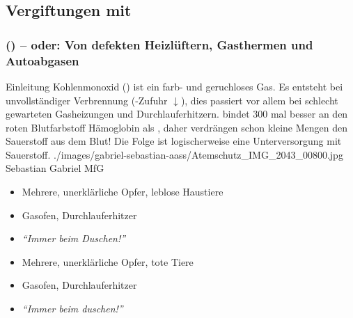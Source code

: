 \subsection{Vergiftungen mit }

\Text
{{\TxBeschreibung}}%
{%

}%



\subsubsection{ 
(\texorpdfstring{}{CO}) -- oder: Von defekten
Heizlüftern, Gasthermen und Autoabgasen}


\TextSlideTeaser
{Einleitung}%
{%
Kohlenmonoxid () ist ein farb- und geruchloses Gas.
Es entsteht bei unvollständiger Verbrennung (-Zufuhr
${\downarrow}$), dies passiert vor allem bei schlecht
gewarteten Gasheizungen und Durchlauferhitzern. 
bindet 300 mal besser an den roten Blutfarbstoff Hämoglobin
als , daher verdrängen schon kleine Mengen den
Sauerstoff aus dem Blut! Die Folge ist logischerweise eine
Unterversorgung mit Sauerstoff.}%
{}%
{./images/gabriel-sebastian-aass/Atemschutz_IMG_2043_00800.jpg}%
{}%
{}%
{Sebastian Gabriel}%
{MfG}%


{
\begin{itemize}
    \item Mehrere, unerklärliche Opfer, leblose Haustiere
    \item Gasofen, Durchlauferhitzer
    \item \emph{\enquote{Immer beim Duschen!}}
\end{itemize}
}{
\begin{itemize}
    \item Mehrere, unerklärliche Opfer, tote Tiere
    \item Gasofen, Durchlauferhitzer
    \item \emph{\enquote{Immer beim duschen!}}
\end{itemize}
}{}{}{}


